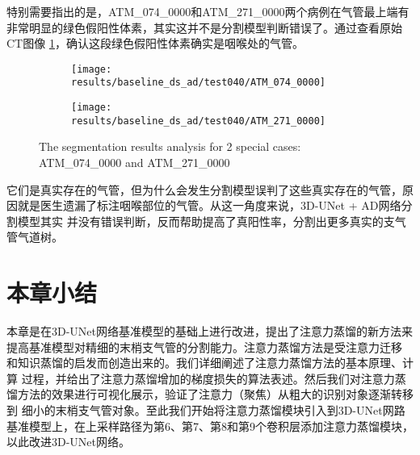 特别需要指出的是，ATM\_074\_0000和ATM\_271\_0000两个病例在气管最上端有非常明显的绿色假阳性体素，其实这并不是分割模型判断错误了。通过查看原始CT图像
\ref{fig:two_special_cases}，确认这段绿色假阳性体素确实是咽喉处的气管。
\begin{figure}[!htp]
	\centering
	\begin{subfigure}{0.48\textwidth}
		\texttt{[image: results/baseline\_ds\_ad/test040/ATM\_074\_0000]}
	\end{subfigure}
	\hfill
	\begin{subfigure}{0.48\textwidth}
		\texttt{[image: results/baseline\_ds\_ad/test040/ATM\_271\_0000]}
	\end{subfigure}
        {The segmentation results analysis for 2 special cases: ATM\_074\_0000 and ATM\_271\_0000}
	\label{fig:two_special_cases}
\end{figure}
它们是真实存在的气管，但为什么会发生分割模型误判了这些真实存在的气管，原因就是医生遗漏了标注咽喉部位的气管。从这一角度来说，3D-UNet + AD网络分割模型其实
并没有错误判断，反而帮助提高了真阳性率，分割出更多真实的支气管气道树。

\section{本章小结}

本章是在3D-UNet网络基准模型的基础上进行改进，提出了注意力蒸馏的新方法来提高基准模型对精细的末梢支气管的分割能力。注意力蒸馏方法是受注意力迁移
\cite{Zagoruyko2016PayingMA}和知识蒸馏\cite{Hinton2015DistillingTK}的启发而创造出来的。我们详细阐述了注意力蒸馏方法的基本原理、计算
过程，并给出了注意力蒸馏增加的梯度损失的算法表述。然后我们对注意力蒸馏方法的效果进行可视化展示，验证了注意力（聚焦）从粗大的识别对象逐渐转移到
细小的末梢支气管对象。至此我们开始将注意力蒸馏模块引入到3D-UNet网路基准模型上，在上采样路径为第6、第7、第8和第9个卷积层添加注意力蒸馏模块，
以此改进3D-UNet网络。


